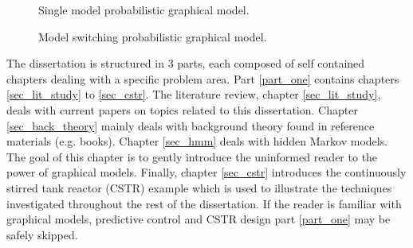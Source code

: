 \begin{figure}[H]
 \centering
\begin{minipage}[b]{0.45\textwidth}
 \centering
{}
\caption{Single model probabilistic graphical model.}
\label{fig_linear}
\end{minipage}\hfill
\begin{minipage}[b]{0.45\textwidth}
 \centering
{}
\caption{Model switching probabilistic graphical model.}
\label{fig_switch_linear}
\end{minipage}
\end{figure}
The dissertation is structured in 3 parts, each composed of self contained chapters dealing with a specific problem area. Part \ref{part_one} contains chapters \ref{sec_lit_study} to \ref{sec_cstr}. The literature review, chapter \ref{sec_lit_study}, deals with current papers on topics related to this dissertation. Chapter \ref{sec_back_theory} mainly deals with background theory found in reference materials (e.g. books). Chapter \ref{sec_hmm} deals with hidden Markov models. The goal of this chapter is to gently introduce the uninformed reader to the power of graphical models. Finally, chapter \ref{sec_cstr} introduces the continuously stirred tank reactor (CSTR) example which is used to illustrate the techniques investigated throughout the rest of the dissertation. If the reader is familiar with graphical models, predictive control and CSTR design part \ref{part_one} may be safely skipped.

